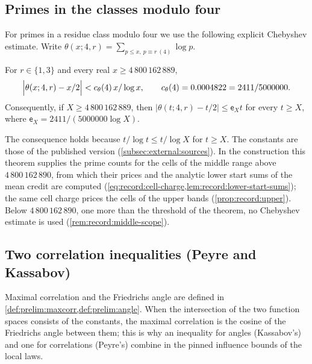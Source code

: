 \subsection{Primes in the classes modulo four}\label{subsec:notation:primes}

For primes in a residue class modulo four we use the following explicit
Chebyshev estimate. Write $\theta(x;4,r)=\sum_{p\le x,\ p\equiv r\ (4)}\log p$.

\begin{theorem}\label{thm:bmor}
For $r\in\{1,3\}$ and every real $x\ge4\,800\,162\,889$,
\[
 \Bigl|\theta(x;4,r)-\frac x2\Bigr|<c_\theta(4)\,\frac{x}{\log x},
 \qquad c_\theta(4)=0.0004822=\frac{2411}{5000000}.
\]
Consequently, if $X\ge4\,800\,162\,889$, then
$|\theta(t;4,r)-t/2|\le\mathsf e_Xt$ for every $t\ge X$, where
$\mathsf e_X=2411/(5000000\log X)$.
\end{theorem}

The consequence holds because $t/\log t\le t/\log X$ for $t\ge X$. The constants
are those of the published version (\cref{subsec:external:sources}). In the
construction this theorem supplies the prime counts for the cells of the middle range above
$4\,800\,162\,890$, from which their prices and the analytic lower start sums of the mean credit are computed
(\cref{eq:record:cell-charge,lem:record:lower-start-sums}); the same cell charge
prices the cells of the upper bands (\cref{prop:record:upper}). Below
$4\,800\,162\,890$, one more than the threshold of the theorem, no Chebyshev estimate is used (\cref{rem:record:middle-scope}).

\subsection{Two correlation inequalities (Peyre and Kassabov)}\label{subsec:notation:correlation}

Maximal correlation and the Friedrichs angle are defined in
\cref{def:prelim:maxcorr,def:prelim:angle}. When the intersection of the two
function spaces consists of the constants, the maximal correlation is the
cosine of the Friedrichs angle between them; this is why an inequality for
angles (Kassabov's) and one for correlations (Peyre's) combine in the pinned
influence bounds of the local laws.

